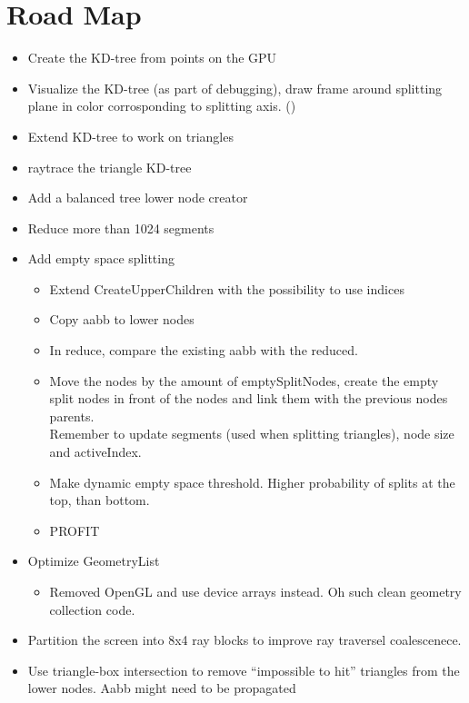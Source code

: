 
\section*{Road Map}


\begin{itemize}
\item \color{green}Create the KD-tree from points on the GPU \checkmark
\item Visualize the KD-tree (as part of debugging), draw frame around
  splitting plane in color corrosponding to splitting axis. (\checkmark)
\item Extend KD-tree to work on triangles \checkmark
\item raytrace the triangle KD-tree \checkmark
\item Add a balanced tree lower node creator \checkmark
\item Reduce more than 1024 segments \checkmark
\item Add empty space splitting
  \begin{itemize}
    \item Extend CreateUpperChildren with the possibility to use indices \checkmark
    \item Copy aabb to lower nodes \checkmark
    \item In reduce, compare the existing aabb with the reduced. \checkmark
    \item Move the nodes by the amount of emptySplitNodes, create the
      empty split nodes in front of the nodes and link them with the
      previous nodes parents.\\ Remember to update segments (used when
      splitting triangles), node size and activeIndex. \checkmark
    \item \color{red}Make dynamic empty space threshold. Higher probability of
      splits at the top, than bottom.
    \item PROFIT
  \end{itemize}
\item Optimize GeometryList
  \begin{itemize}
  \item Removed OpenGL and use device arrays instead. Oh such clean
    geometry collection code. \checkmark
  \end{itemize}
\item Partition the screen into 8x4 ray blocks to improve ray
  traversel coalescenece. \checkmark
\item Use triangle-box intersection to remove ``impossible to hit''
  triangles from the lower nodes. Aabb might need to be propagated

\end{itemize}
